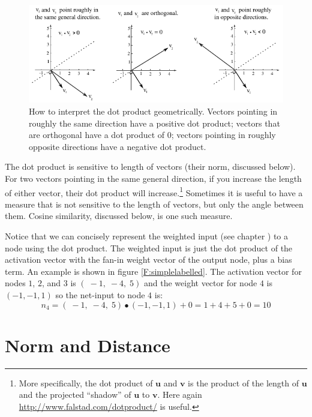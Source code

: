 \begin{figure}[h]
\centering
\includegraphics[scale=1.2]{./images/dotProductDirections.pdf}
\caption[Scott Hotton.]{How to interpret the dot product geometrically. Vectors pointing in roughly the same direction have a positive dot product; vectors that are orthogonal have a dot product of 0;  vectors pointing in roughly opposite directions have a negative dot product.}
\label{dotProductDirections}
\end{figure}

The dot product is sensitive to length of vectors (their norm, discussed below). For two vectors pointing in the same general direction, if you increase the length of either vector, their dot product will increase.\footnote{More specifically, the dot product of $\textbf{u}$ and $\textbf{v}$ is the product of the length of $\textbf{u}$ and the projected ``shadow'' of $\textbf{u}$ to $\textbf{v}$. Here again \url{http://www.falstad.com/dotproduct/} is useful.} Sometimes it is useful to have a measure that is not sensitive to the length of vectors, but only the angle between them. Cosine similarity, discussed below, is one such measure.

   Notice that we can concisely represent the weighted input (see chapter 
) to a node using the dot product. The weighted input 
is just the dot product of the activation vector with the fan-in weight vector 
of the output node, plus a bias term. An example is shown in figure 
\ref{F:simplelabelled}. The activation vector for nodes $1$, $2$, and $3$ is 
$(\; -1,\; -4,\; 5)$ and the weight vector for node $4$ is $(-1,-1,1)$ so the 
net-input to node $4$ is:
\begin{equation*}
n_4 = (\; -1,\; -4,\; 5) \bullet (-1,-1,1) + 0  = 1 + 4 + 5 + 0 = 10
\end{equation*}
 
\section{Norm and Distance}\label{metricSpace}

